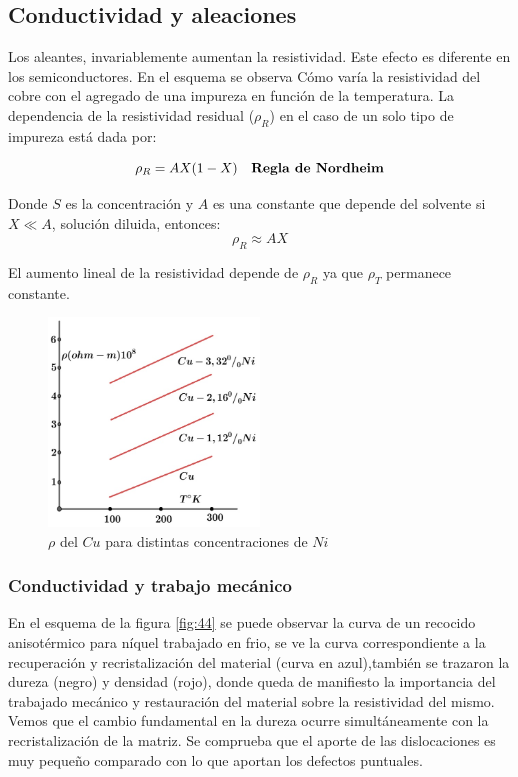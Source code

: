 \subsection{Conductividad y aleaciones}

Los aleantes, invariablemente aumentan la resistividad. Este efecto es diferente en los semiconductores. En el esquema se observa Cómo varía la resistividad del cobre con el agregado de una impureza en función de la temperatura. La dependencia de la resistividad residual ($\rho_{R}$) en el caso de un solo tipo de impureza está dada por:

\begin{equation}
\rho_{R}=AX(1-X) \quad \text{\textbf{Regla de Nordheim}}
\end{equation}

Donde $S$ es la concentración y $A$ es una constante que depende del solvente si $X \ll A$, solución diluida, entonces:
\[
\rho_{R} \approx AX 
\]

El aumento lineal de la resistividad depende de $\rho_{R}$ ya que $\rho_{T}$ permanece constante.

\begin{figure}[H]
    \centering
    \includegraphics[width=0.5\textwidth]{./Figures/fig42}
	\caption{$\rho$ del $Cu$ para distintas concentraciones de $Ni$}
	\label{fig:42}
\end{figure}

\subsubsection{Conductividad y trabajo mecánico}

En el esquema de la figura \ref{fig:44} se puede observar la curva de un recocido anisotérmico para níquel trabajado en frio, se ve la curva correspondiente a la recuperación y recristalización del material (curva en azul),también se trazaron la dureza (negro) y densidad (rojo), donde queda de manifiesto la importancia del trabajado mecánico y restauración del material sobre la resistividad del mismo. Vemos que el cambio fundamental en la dureza ocurre simultáneamente con la recristalización de la matriz. Se comprueba que el aporte de las dislocaciones es muy pequeño comparado con lo que aportan los defectos puntuales.

